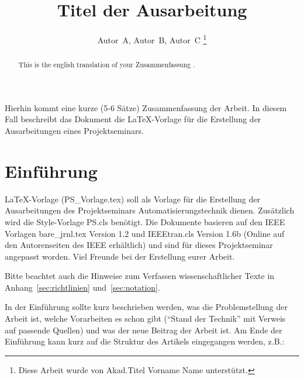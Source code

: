 \documentclass[journal,final,a4paper,twoside]{PS}
\begin{document}
\newcommand{\euertitel}{Titel der Ausarbeitung}   %
\newcommand{\betreuer}{Akad.Titel Vorname Name }  %

\headsep 40pt
\title{\euertitel}
\author{Autor~A,
        Autor~B,
        Autor~C
\thanks{Diese Arbeit wurde von \betreuer unterstützt.}}

\maketitle


\begin{Zusammenfassung}
Hierhin kommt eine kurze (5-6 Sätze) Zusammenfassung der Arbeit. In diesem Fall beschreibt das Dokument die \LaTeX -Vorlage für die Erstellung der Ausarbeitungen eines Projektseminars.
\end{Zusammenfassung}
\vspace{6pt}

\begin{abstract}
This is the english translation of your \glqq Zusammenfassung \grqq.
\end{abstract}

\section{Einführung}

 \LaTeX -Vorlage (PS\_Vorlage.tex) soll als
Vorlage für die Erstellung der Ausarbeitungen des Projektseminars
Automatisierungstechnik dienen. Zusätzlich wird die
Style-Vorlage PS.cls benötigt. Die Dokumente basieren auf den IEEE
Vorlagen bare\_jrnl.tex Version 1.2 und IEEEtran.cls Version 1.6b
(Online auf den Autorenseiten des IEEE erhältlich) und sind für
dieses Projektseminar angepasst worden. Viel Freunde bei der
Erstellung eurer Arbeit.

Bitte beachtet auch die Hinweise zum Verfassen wissenschaftlicher Texte in Anhang~\ref{sec:richtlinien} und~\ref{sec:notation}.

In der Einführung sollte kurz beschrieben werden, was die Problemstellung der Arbeit ist, welche Vorarbeiten es schon gibt (``Stand der Technik'' mit Verweis auf passende Quellen) und was der neue Beitrag der Arbeit ist. Am Ende der Einführung kann kurz auf die Struktur des Artikels eingegangen werden, z.B.: 
\end{document}
